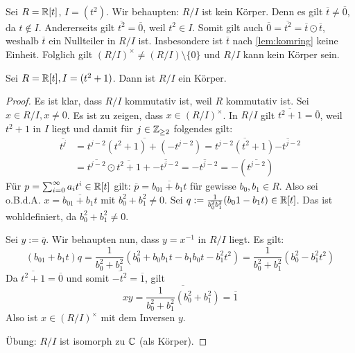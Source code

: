 \documentclass[12pt,a4paper]{scrartcl}
\begin{document}
\begin{bsp}
	Sei $R = \mathbb R[t]$, $I = (t^2)$. Wir behaupten: $R/I$ ist kein Körper. Denn es gilt $\overline{t} \neq \overline{0}$, da $t\notin I$. Andererseits gilt $\overline{t^2} = \overline{0}$, weil $t^2\in I$. Somit gilt auch $\overline{0} = \overline{t^2} = \overline{t}\odot\overline{t}$, weshalb $\overline{t}$ ein Nullteiler in $R/I$ ist. Insbesondere ist $\overline{t}$ nach \cref{lem:komring} keine Einheit. Folglich gilt $(R/I)^{\times} \neq (R/I)\setminus\{0\}$ und $R/I$ kann kein Körper sein.
\end{bsp}

\begin{bsp}
	Sei $R = \mathbb R [t], I = (t^2+1)$. Dann ist $R/I$ ein Körper.
\end{bsp}

\begin{proof}
	Es ist klar, dass $R/I$ kommutativ ist, weil $R$ kommutativ ist. Sei $x\in R/I, x\neq 0$. Es ist zu zeigen, dass $x\in (R/I)^{\times}$. In $R/I$ gilt $\overline{t^2+1} = \overline{0}$, weil $t^2+1$ in $I$ liegt und damit für $j\in \mathbb Z_{\geq 2}$ folgendes gilt:
	\begin{align*}
		\overline{t ^j} &= \overline{t^{j-2}(t^2+1)+(-t^{j-2})} = \overline{t^{j-2}(t^2+1)} \overline{-t^{j-2}} \\
		&= \overline{t^{j-2}}\odot \overline{t^2+1} + \overline{-t^{j-2}} = \overline{-t^{j-2}} = - (\overline{t^{j-2}})
	\end{align*}
	Für $p = \sum_{i = 0}^{\infty}a_it^i\in\mathbb R[t]$ gilt: $\overline{p} = \overline{b_01+b_1t}$ für gewisse $b_0,b_1\in R$. Also sei o.B.d.A. $x = \overline{b_01+b_1t}$ mit $b_0^2+b_1^2 \neq 0$. Sei $q := \frac{1}{b_0^2b_1^2}(b_01-b_1t)\in \mathbb R[t]$. Das ist wohldefiniert, da $b_0^2+b_1^2 \neq 0$.
	
	Sei $y := \overline{q}$. Wir behaupten nun, dass $y = x^{-1}$ in $R/I$ liegt. Es gilt: 
	$$ (b_01 +b_1t) q = \frac{1}{b_0^2+b_1^2}(b_0^2+b_0b_1t-b_1b_0t-b_1^2t^2) = \frac{1}{b_0^2+b_1^2}(b_0^2-b_1^2t^2)$$
	Da $\overline{t^2+1} = \overline{0}$ und somit $\overline{-t^2} = \overline{1}$, gilt 
	$$xy = \overline{\frac{1}{b_0^2+b_1^2}(b_0^2+b_1^2)} = \overline{1}$$
	Also ist $x\in (R/I)^{\times}$ mit dem Inversen $y$.
	
	Übung: $R/I$ ist isomorph zu $\mathbb C$ (als Körper).
\end{proof}
\end{document}
